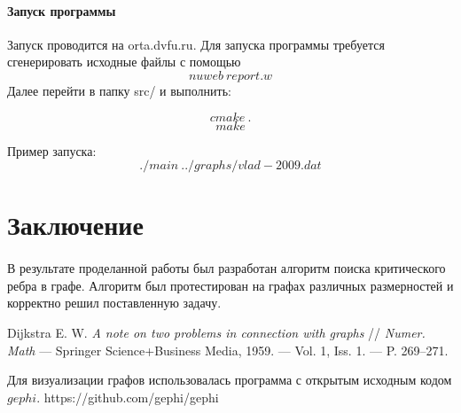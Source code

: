 \documentclass[12pt]{article}
\begin{document}
\paragraph{Запуск программы}

Запуск проводится на orta.dvfu.ru.
Для запуска программы требуется сгенерировать исходные файлы с помощью 
$$nuweb\ report.w$$
Далее перейти в папку src/ и выполнить:

$$cmake\ .$$
$$make$$

Пример запуска:
$$./main\ ../graphs/vlad-2009.dat$$

\section{Заключение}

\paragraph{}
В результате проделанной работы был разработан алгоритм поиска критического ребра в графе.
Алгоритм был протестирован на графах различных размерностей и корректно решил поставленную задачу.

\newpage

\begin{thebibliography}{9}
Dijkstra E. W. \textit{A note on two problems in connection with graphs} //
\textit{Numer. Math} — Springer Science+Business Media, 1959.
— Vol. 1, Iss. 1. — P. 269–271.
\end{thebibliography}

Для визуализации графов использовалась программа с открытым исходным кодом $gephi$.
https://github.com/gephi/gephi
\end{document}
